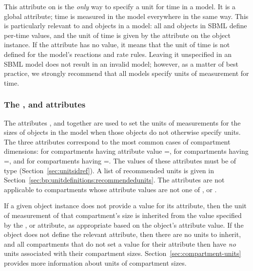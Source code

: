 This attribute on \Model is the \emph{only} way to specify a unit
for time in a model.  It is a global attribute; time is measured
in the model everywhere in the same way.  This is particularly
relevant to \Reaction and \RateRule objects in a model: all
\Reaction and \RateRule objects in SBML define per-time values,
and the unit of time is given by the  attribute
on the \Model object instance.  If the \Model {}
attribute has no value, it means that the unit of time is not
defined for the model's reactions and rate rules.  Leaving it
unspecified in an SBML model does not result in an invalid model;
however, as a matter of best practice, we strongly recommend that
all models specify units of measurement for time.


\subsubsection{The ,  and
   attributes}
\label{sec:model-volumeUnits}
\label{sec:model-areaUnits}
\label{sec:model-lengthUnits}
\label{volumeunits}
\label{areaunits}
\label{lengthunits}

The attributes ,  and
 together are used to set the units of
measurements for the sizes of \Compartment objects in the model
when those objects do not otherwise specify units.  The three
attributes correspond to the most common cases of compartment
dimensions:  for compartments having attribute
value =,  for
compartments having =, and
 for compartments having
=.  The values of these attributes
must be of type 
(Section~\ref{sec:unitsidref}).  A list of recommended units is
given in Section~\ref{sec:bp:unitdefinitions:recommendedunits}.
The attributes are not applicable to compartments whose
 attribute values are not one of ,
 or .

If a given \Compartment object instance does not provide a value
for its  attribute, then the unit of measurement of
that compartment's size is inherited from the value specified by
the \Model {},  or
 attribute, as appropriate based on the
\Compartment object's  attribute value.
If the \Model object does not define the relevant attribute, then
there are no units to inherit, and all compartments that do not
set a value for their  attribute then have \emph{no}
units associated with their compartment sizes.
Section~\ref{sec:compartment-units} provides more information
about units of compartment sizes.

